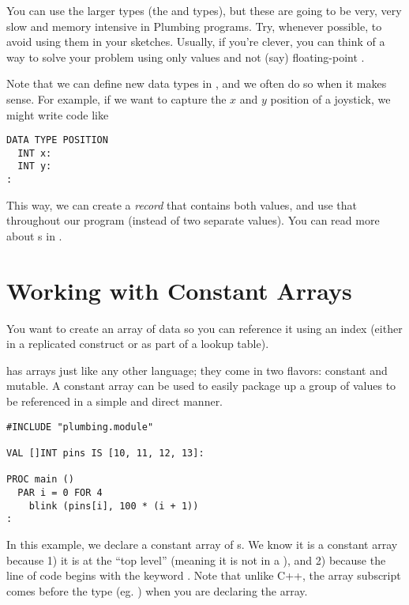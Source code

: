 You can use the larger types (the \INTTT and \REALTT types), but these are going to be very, very slow and memory intensive in Plumbing programs. Try, whenever possible, to avoid using them in your sketches. Usually, if you're clever, you can think of a way to solve your problem using only \INT values and not (say) floating-point \REALTT.

Note that we can define new data types in \occam, and we often do so when it makes sense. For example, if we want to capture the $x$ and $y$ position of a joystick, we might write code like

\begin{lstlisting}
DATA TYPE POSITION
  INT x:
  INT y:
:
\end{lstlisting}

This way, we can create a \emph{record} that contains both values, and use that throughout our program (instead of two separate values). You can read more about {\RECORD}s in \FIXME.

\seealso

\XXX

% 

\section{Working with Constant Arrays}
\problem
You want to create an array of data so you can reference it using an index (either in a replicated construct or as part of a lookup table). 

\solution
\occam has arrays just like any other language; they come in two flavors: constant and mutable. A constant array can be used to easily package up a group of values to be referenced in a simple and direct manner.

\begin{lstlisting}
#INCLUDE "plumbing.module"

VAL []INT pins IS [10, 11, 12, 13]:

PROC main ()
  PAR i = 0 FOR 4
    blink (pins[i], 100 * (i + 1))
:
\end{lstlisting}

In this example, we declare a constant array of {\INT}s. We know it is a constant array because 1) it is at the ``top level'' (meaning it is not in a \PROC), and 2) because the line of code begins with the keyword \VAL. Note that unlike C++, the array subscript comes before the type (eg. {\code []\INT}) when you are declaring the array.

